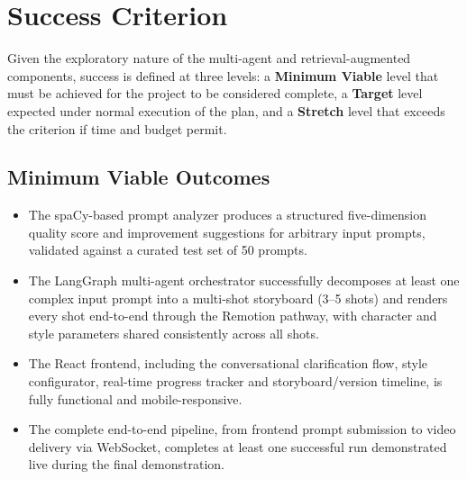 \documentclass[11pt,a4paper]{article}
\begin{document}
\needspace{0.5\textheight}
\section{Success Criterion}

Given the exploratory nature of the multi-agent and retrieval-augmented components, success is defined at three levels: a \textbf{Minimum Viable} level that must be achieved for the project to be considered complete, a \textbf{Target} level expected under normal execution of the plan, and a \textbf{Stretch} level that exceeds the criterion if time and budget permit.

\subsection*{Minimum Viable Outcomes}
\begin{itemize}[leftmargin=*]
\item The spaCy-based prompt analyzer produces a structured five-dimension quality score and improvement suggestions for arbitrary input prompts, validated against a curated test set of 50 prompts.
\item The LangGraph multi-agent orchestrator successfully decomposes at least one complex input prompt into a multi-shot storyboard (3--5 shots) and renders every shot end-to-end through the Remotion pathway, with character and style parameters shared consistently across all shots.
\item The React frontend, including the conversational clarification flow, style configurator, real-time progress tracker and storyboard/version timeline, is fully functional and mobile-responsive.
\item The complete end-to-end pipeline, from frontend prompt submission to video delivery via WebSocket, completes at least one successful run demonstrated live during the final demonstration.
\end{itemize}
\end{document}
